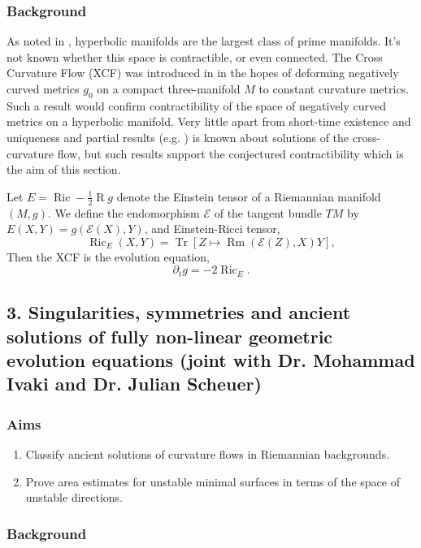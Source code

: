 \documentclass[12pt]{amsart}
\begin{document}
\subsubsection*{Background}
\label{sec-2-2-2}

As noted in \cite{MR2602839}, hyperbolic manifolds are the largest class of prime manifolds. It's not known whether this space is contractible, or even connected. The Cross Curvature Flow (XCF) was introduced in \cite{MR2055396} in the hopes of deforming negatively curved metrics $g_0$ on a compact three-manifold $M$ to constant curvature metrics. Such a result would confirm contractibility of the space of negatively curved metrics on a hyperbolic manifold. Very little apart from short-time existence and uniqueness \cite{MR2207496} and partial results (e.g. \cite{MR2448593,MR2407107}) is known about solutions of the cross-curvature flow, but such results support the conjectured contractibility which is the aim of this section.

Let $E = \operatorname{Ric} - \tfrac{1}{2} \operatorname{R} g$ denote the Einstein tensor of a Riemannian manifold $(M, g)$. We define the endomorphism $\mathcal{E}$ of the tangent bundle $TM$ by $E(X, Y) = g(\mathcal{E}(X), Y)$, and Einstein-Ricci tensor,
\[
\operatorname{Ric}_E (X, Y) = \operatorname{Tr} \left[Z \mapsto \operatorname{Rm} (\mathcal{E}(Z), X) Y\right],
\]
Then the XCF is the evolution equation,
\[
\partial_t g = -2 \operatorname{Ric}_E.
\]

\subsection*{3. Singularities, symmetries and ancient solutions of fully non-linear geometric evolution equations (joint with Dr. Mohammad Ivaki and Dr. Julian Scheuer)}
\label{sec-2-3}

\subsubsection*{Aims}
\label{sec-2-3-1}
\begin{enumerate}
\item Classify ancient solutions of curvature flows in Riemannian backgrounds.
\item Prove area estimates for unstable minimal surfaces in terms of the space of unstable directions.
\end{enumerate}
\subsubsection*{Background}
\label{sec-2-3-2}
\end{document}

